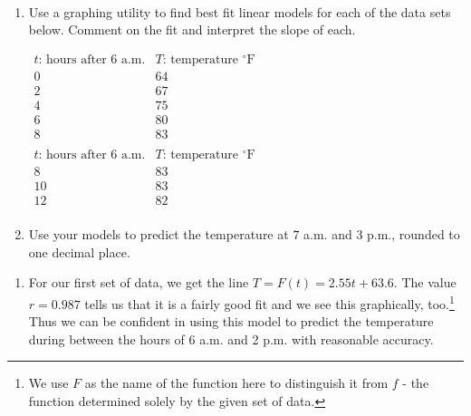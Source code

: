 \documentclass{ximera}
\begin{document}
\begin{example} \label{timetempregressionex}  $~$
  
\begin{enumerate}
  
\item Use a graphing utility to find best fit linear models for each of the data sets below. Comment on the fit and interpret the slope of each.

\begin{center}
  

  
$\begin{array}{|c||c|}  \hline

 \text{$t$: hours after 6 a.m.}  & \text{$T$: temperature $^{\circ}$F} \\ \hline
 0 & 64  \\
 2 & 67  \\
 4 &  75  \\
 6 &  80 \\
 8 & 83  \\

\end{array}$\quad\quad
$\begin{array}{|c||c|}  \hline

 \text{$t$: hours after 6 a.m.}  & \text{$T$: temperature $^{\circ}$F} \\ \hline

 8 & 83  \\
 10 &  83 \\
 12 & 82  \\

\end{array}$ 
  

  
\end{center}

\item  Use your models to predict the temperature at $7$ a.m. and $3$ p.m., rounded to one decimal place.
  
\end{enumerate}

\begin{explanation}
  
\begin{enumerate}
  
 \item For our first set of data, we get the line $T = F(t) = 2.55t + 63.6$.  The value $r = 0.987$ tells us that it is a fairly good fit and we see this graphically, too.\footnote{We use $F$ as the name of the function here to distinguish it from $f$ - the function determined solely by the given set of data.}   Thus we can be confident in using this model to predict the temperature during between the hours of 6 a.m. and 2 p.m. with reasonable accuracy.   




\end{enumerate}
\end{explanation}
\end{example}
\end{document}
